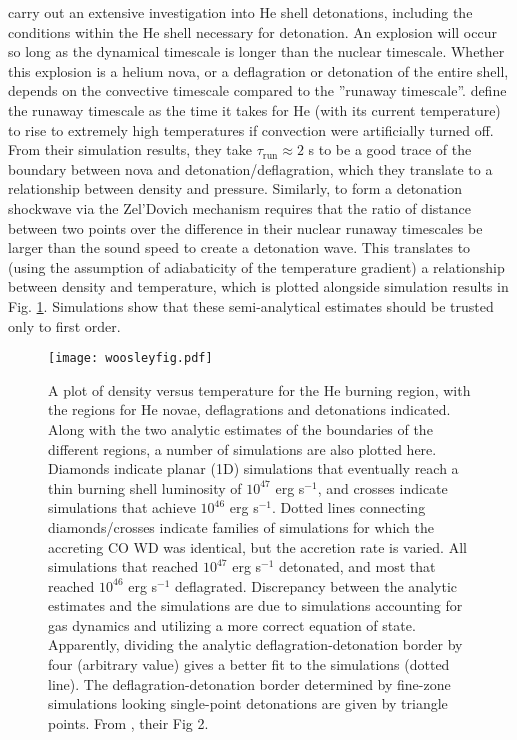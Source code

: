 \cite{woosk10} carry out an extensive investigation into He shell detonations, including the conditions within the He shell necessary for detonation.  An explosion will occur so long as the dynamical timescale is longer than the nuclear timescale.  Whether this explosion is a helium nova, or a deflagration or detonation of the entire shell, depends on the convective timescale compared to the ''runaway timescale''.  \citeauthor{woosk10} define the runaway timescale as the time it takes for He (with its current temperature) to rise to extremely high temperatures if convection were artificially turned off.  From their simulation results, they take $\tau_{\mathrm{run}} \approx 2$ s to be a good trace of the boundary between nova and detonation/deflagration, which they translate to a relationship between density and pressure.  Similarly, to form a detonation shockwave via the Zel'Dovich mechanism requires that the ratio of distance between two points over the difference in their nuclear runaway timescales be larger than the sound speed to create a detonation wave.  This translates to (using the assumption of adiabaticity of the temperature gradient) a relationship between density and temperature, which is plotted alongside simulation results in Fig. \ref{woosleyfig}.  Simulations show that these semi-analytical estimates should be trusted only to first order.

\begin{figure}
\centerline{\texttt{[image: woosleyfig.pdf]}}
\caption{A plot of density versus temperature for the He burning region, with the regions for He novae, deflagrations and detonations indicated.  Along with the two analytic estimates of the boundaries of the different regions, a number of simulations are also plotted here.  Diamonds indicate planar (1D) simulations that eventually reach a thin burning shell luminosity of $10^{47}$ erg s$^{-1}$, and crosses indicate simulations that achieve $10^{46}$ erg s$^{-1}$.  Dotted lines connecting diamonds/crosses indicate families of simulations for which the accreting CO WD was identical, but the accretion rate is varied.  All simulations that reached $10^{47}$ erg s$^{-1}$ detonated, and most that reached $10^{46}$ erg s$^{-1}$ deflagrated.  Discrepancy between the analytic estimates and the simulations are due to simulations accounting for gas dynamics and utilizing a more correct equation of state.  Apparently, dividing the analytic deflagration-detonation border by four (arbitrary value) gives a better fit to the simulations (dotted line).  The deflagration-detonation border determined by fine-zone simulations looking single-point detonations are given by triangle points.  From \cite{woosk10}, their Fig 2.}
\label{woosleyfig}
\end{figure}

